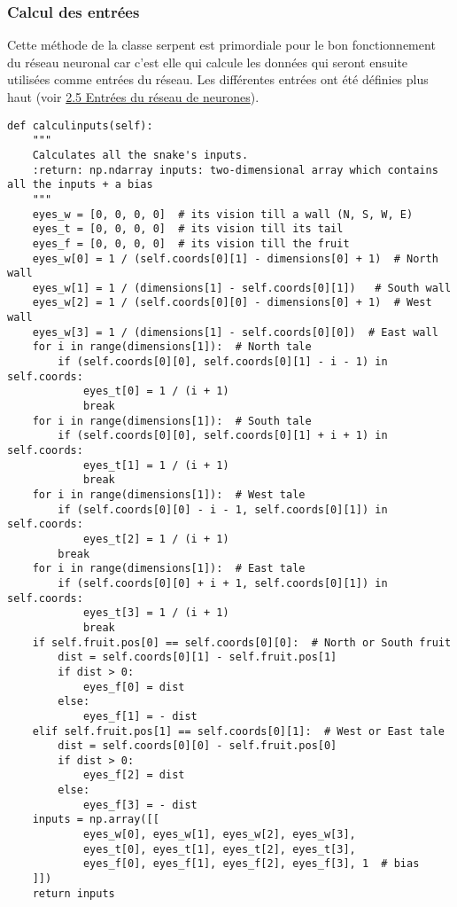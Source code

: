 \documentclass[12pt, a4paper, openany]{book}
\begin{document}
\subsubsection{Calcul des entrées}
\label{r:2.7.3-ent}
Cette méthode de la classe serpent est primordiale pour le bon fonctionnement du réseau neuronal car c'est elle qui calcule les données qui seront ensuite utilisées comme entrées du réseau. Les différentes entrées ont été définies plus haut (voir \hyperref[r:2.5]{2.5 Entrées du réseau de neurones}).
\begin{verbatim}
def calculinputs(self):
    """
    Calculates all the snake's inputs.
    :return: np.ndarray inputs: two-dimensional array which contains all the inputs + a bias
    """
    eyes_w = [0, 0, 0, 0]  # its vision till a wall (N, S, W, E)
    eyes_t = [0, 0, 0, 0]  # its vision till its tail
    eyes_f = [0, 0, 0, 0]  # its vision till the fruit
    eyes_w[0] = 1 / (self.coords[0][1] - dimensions[0] + 1)  # North wall
    eyes_w[1] = 1 / (dimensions[1] - self.coords[0][1])   # South wall
    eyes_w[2] = 1 / (self.coords[0][0] - dimensions[0] + 1)  # West wall
    eyes_w[3] = 1 / (dimensions[1] - self.coords[0][0])  # East wall
    for i in range(dimensions[1]):  # North tale
        if (self.coords[0][0], self.coords[0][1] - i - 1) in self.coords:
            eyes_t[0] = 1 / (i + 1)
            break
    for i in range(dimensions[1]):  # South tale
        if (self.coords[0][0], self.coords[0][1] + i + 1) in self.coords:
            eyes_t[1] = 1 / (i + 1)
            break
    for i in range(dimensions[1]):  # West tale
        if (self.coords[0][0] - i - 1, self.coords[0][1]) in self.coords:
            eyes_t[2] = 1 / (i + 1)
        break
    for i in range(dimensions[1]):  # East tale
        if (self.coords[0][0] + i + 1, self.coords[0][1]) in self.coords:
            eyes_t[3] = 1 / (i + 1)
            break
    if self.fruit.pos[0] == self.coords[0][0]:  # North or South fruit
        dist = self.coords[0][1] - self.fruit.pos[1]
        if dist > 0:
            eyes_f[0] = dist
        else:
            eyes_f[1] = - dist
    elif self.fruit.pos[1] == self.coords[0][1]:  # West or East tale
        dist = self.coords[0][0] - self.fruit.pos[0]
        if dist > 0:
            eyes_f[2] = dist
        else:
            eyes_f[3] = - dist
    inputs = np.array([[
            eyes_w[0], eyes_w[1], eyes_w[2], eyes_w[3],
            eyes_t[0], eyes_t[1], eyes_t[2], eyes_t[3],
            eyes_f[0], eyes_f[1], eyes_f[2], eyes_f[3], 1  # bias
    ]])
    return inputs
\end{verbatim}
\end{document}
